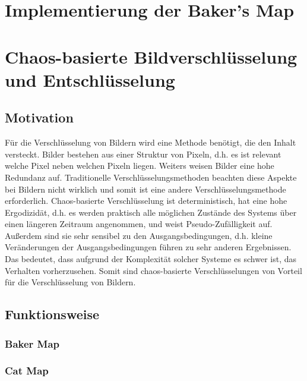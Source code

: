 
\usepackage[naustrian]{babel}


\maketitle

\section{Implementierung der Baker's Map}
% 

\section{Chaos-basierte Bildverschlüsselung und Entschlüsselung}
\subsection{Motivation}
Für die Verschlüsselung von Bildern wird eine Methode benötigt, die den Inhalt
versteckt. Bilder bestehen aus einer Struktur von Pixeln, d.h. es ist relevant welche Pixel neben welchen
Pixeln liegen. Weiters weisen Bilder eine hohe Redundanz auf. Traditionelle Verschlüsselungsmethoden beachten
diese Aspekte bei Bildern nicht wirklich und somit ist eine andere Verschlüsselungsmethode erforderlich.
Chaos-basierte Verschlüsselung ist deterministisch, hat eine hohe Ergodizidät, d.h. es werden praktisch alle
möglichen Zustände des Systems über einen längeren Zeitraum angenommen, und weist Pseudo-Zufälligkeit auf. Außerdem
sind sie sehr sensibel zu den Ausgangsbedingungen, d.h. kleine Veränderungen der Ausgangsbedingungen führen zu
sehr anderen Ergebnissen. Das bedeutet, dass aufgrund der Komplexität solcher Systeme es schwer ist,
das Verhalten vorherzusehen.
Somit sind chaos-basierte Verschlüsselungen von Vorteil für die Verschlüsselung von Bildern.
\cite{zhang2023}

\subsection{Funktionsweise}
\cite{IEEEMap}



\subsubsection{Baker Map}

\subsubsection{Cat Map}



